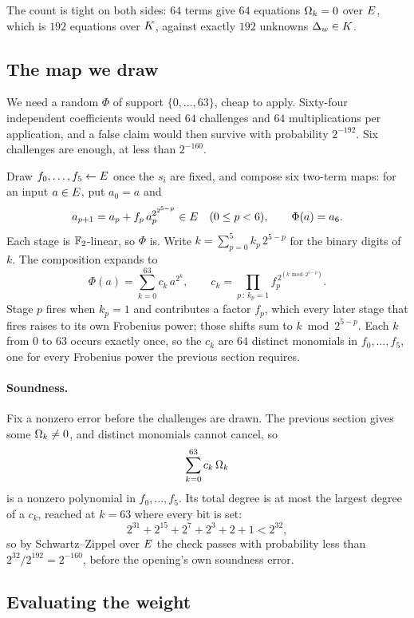 The count is tight on both sides: $64$ terms give $64$ equations $\Omega_k=0$ over $E$, which is $192$ equations over $K$, against exactly $192$ unknowns $\Delta_w\in K$.

\subsection{The map we draw}\label{rs:map}

We need a random $\Phi$ of support $\{0,\dots,63\}$, cheap to apply. Sixty-four independent coefficients would need $64$ challenges and $64$ multiplications per application, and a false claim would then survive with probability $2^{-192}$. Six challenges are enough, at less than $2^{-160}$.

Draw $f_0,\dots,f_5\leftarrow E$ once the $s_i$ are fixed, and compose six two-term maps: for an input $a\in E$, put $a_0=a$ and
\begin{equation}
a_{p+1}=a_p+f_p\,a_p^{2^{2^{5-p}}}\in E\quad(0\le p<6),
\qquad
\Phi(a)=a_6.
\label{eq:phi}
\end{equation}
Each stage is $\mathbb{F}_2$-linear, so $\Phi$ is. Write $k=\sum_{p=0}^{5}k_p\,2^{5-p}$ for the binary digits of $k$. The composition expands to
\begin{equation}
\Phi(a)=\sum_{k=0}^{63}c_k\,a^{2^k},
\qquad
c_k=\prod_{p\,:\,k_p=1}f_p^{\,2^{(k\bmod 2^{5-p})}}.
\label{eq:ck}
\end{equation}
Stage $p$ fires when $k_p=1$ and contributes a factor $f_p$, which every later stage that fires raises to its own Frobenius power; those shifts sum to $k\bmod 2^{5-p}$. Each $k$ from $0$ to $63$ occurs exactly once, so the $c_k$ are $64$ distinct monomials in $f_0,\dots,f_5$, one for every Frobenius power the previous section requires.

\paragraph{Soundness.} Fix a nonzero error before the challenges are drawn. The previous section gives some $\Omega_k\neq0$, and distinct monomials cannot cancel, so
\[
\sum_{k=0}^{63}c_k\,\Omega_k
\]
is a nonzero polynomial in $f_0,\dots,f_5$. Its total degree is at most the largest degree of a $c_k$, reached at $k=63$ where every bit is set:
\[
2^{31}+2^{15}+2^7+2^3+2+1<2^{32},
\]
so by Schwartz--Zippel over $E$ the check passes with probability less than $2^{32}/2^{192}=2^{-160}$, before the opening's own soundness error.

\subsection{Evaluating the weight}\label{rs:weight}

